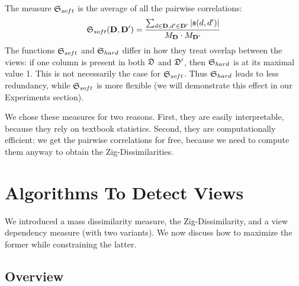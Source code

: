 The measure  $\mathfrak{S}_{soft}$ is the average of all the pairwise
correlations:
\begin{gather}
    \mf{S}_{soft}(\rb{D}, \rb{D'}) = 
    \frac{\sum_{d \in \rb{D}, d' \in \rb{D'}} |\mf{s}(d, d')|}
        {M_\rb{D} \cdot M_{\rb{D}'}}
\end{gather}
The functions $\mathfrak{S}_{soft}$ and $\mathfrak{S}_{hard}$ differ in how they treat
overlap between the views: if one column is present in both $\mathfrak{D}$ and
$\mathfrak{D}'$, then $\mathfrak{S}_{hard}$ is at its maximal value 1. This is not
necessarily the case for $\mathfrak{S}_{soft}$. Thus $\mathfrak{S}_{hard}$ leads to less
redundancy, while $\mathfrak{S}_{soft}$ is more flexible (we will demonstrate this
effect in our Experiments section).

We chose these measures for two reasons. First, they are easily interpretable,
because they rely on textbook statistics.  Second, they are computationally
efficient: we get the pairwise correlations for free, because we need to
compute them anyway to obtain the Zig-Dissimilarities. 



\section{Algorithms To Detect Views}
\label{sec:algorithm}

We introduced a mass dissimilarity measure, the Zig-Dis\-simi\-larity, and a
view dependency measure (with two variants). We now discuss how to
maximize the former while constraining the latter.

\subsection{Overview}
\label{sec:overview}

